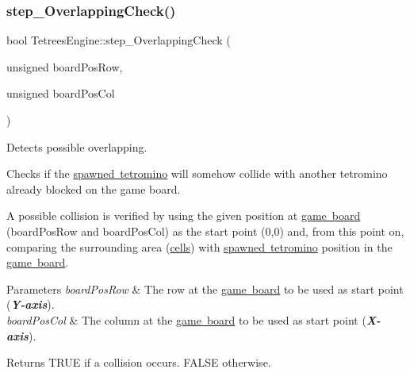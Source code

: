 \subsubsection{\texorpdfstring{step\+\_\+\+Overlapping\+Check()}{step\_OverlappingCheck()}}
{\footnotesize\ttfamily bool Tetrees\+Engine\+::step\+\_\+\+Overlapping\+Check (\begin{DoxyParamCaption}\item[{unsigned}]{board\+Pos\+Row,  }\item[{unsigned}]{board\+Pos\+Col }\end{DoxyParamCaption})\hspace{0.3cm}{\ttfamily [private]}}



Detects possible overlapping. 

Checks if the \mbox{\hyperlink{classTetreesEngine_a26435ee2f02d9ba70d9e359745114f6e}{spawned tetromino}} will somehow collide with another tetromino already blocked on the game board.

A possible collision is verified by using the given position at \mbox{\hyperlink{classTetreesEngine_a37d082a7816d6731b2703dd6d1a1cb97}{game board}} (board\+Pos\+Row and board\+Pos\+Col) as the start point (0,0) and, from this point on, comparing the surrounding area (\mbox{\hyperlink{TetreesDefs_8hpp_a7c8699d7ca48189b748ba8f94eb9d515}{cells}}) with \mbox{\hyperlink{classTetreesEngine_a26435ee2f02d9ba70d9e359745114f6e}{spawned tetromino}} position in the \mbox{\hyperlink{classTetreesEngine_a37d082a7816d6731b2703dd6d1a1cb97}{game board}}. 
\begin{DoxyParams}{Parameters}
{\em board\+Pos\+Row} & The row at the \mbox{\hyperlink{classTetreesEngine_a37d082a7816d6731b2703dd6d1a1cb97}{game board}} to be used as start point ({\itshape {\bfseries Y-\/axis}}). \\
\hline
{\em board\+Pos\+Col} & The column at the \mbox{\hyperlink{classTetreesEngine_a37d082a7816d6731b2703dd6d1a1cb97}{game board}} to be used as start point ({\itshape {\bfseries X-\/axis}}). \\
\hline
\end{DoxyParams}
\begin{DoxyReturn}{Returns}
{\ttfamily T\+R\+UE} if a collision occurs. {\ttfamily F\+A\+L\+SE} otherwise. 
\end{DoxyReturn}
\mbox{\label{classTetreesEngine_a626d60fa8adb2dd024016b5cfed4f6ee}} 
